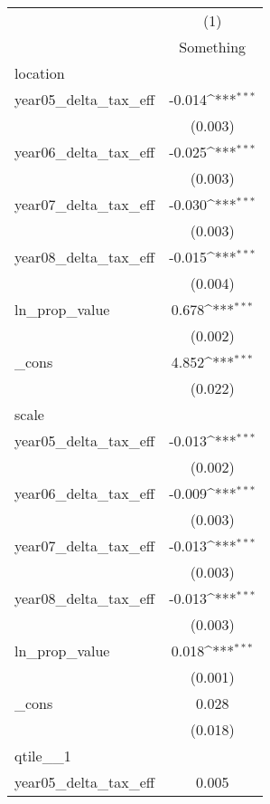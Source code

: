{
\def\sym#1{\ifmmode^{#1}\else\(^{#1}\)\fi}
\begin{tabular}{l*{1}{c}}
\hline\hline
            &\multicolumn{1}{c}{(1)}\\
            &\multicolumn{1}{c}{Something}\\
\hline
location    &                     \\
year05\_delta\_tax\_eff&      -0.014\sym{***}\\
            &     (0.003)         \\
[1em]
year06\_delta\_tax\_eff&      -0.025\sym{***}\\
            &     (0.003)         \\
[1em]
year07\_delta\_tax\_eff&      -0.030\sym{***}\\
            &     (0.003)         \\
[1em]
year08\_delta\_tax\_eff&      -0.015\sym{***}\\
            &     (0.004)         \\
[1em]
ln\_prop\_value&       0.678\sym{***}\\
            &     (0.002)         \\
[1em]
\_cons      &       4.852\sym{***}\\
            &     (0.022)         \\
\hline
scale       &                     \\
year05\_delta\_tax\_eff&      -0.013\sym{***}\\
            &     (0.002)         \\
[1em]
year06\_delta\_tax\_eff&      -0.009\sym{***}\\
            &     (0.003)         \\
[1em]
year07\_delta\_tax\_eff&      -0.013\sym{***}\\
            &     (0.003)         \\
[1em]
year08\_delta\_tax\_eff&      -0.013\sym{***}\\
            &     (0.003)         \\
[1em]
ln\_prop\_value&       0.018\sym{***}\\
            &     (0.001)         \\
[1em]
\_cons      &       0.028         \\
            &     (0.018)         \\
\hline
qtile\_\_1    &                     \\
year05\_delta\_tax\_eff&       0.005         \\

\end{tabular}}
